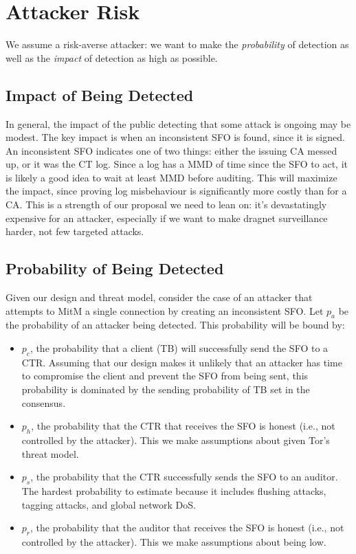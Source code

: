\section{Attacker Risk}
We assume a risk-averse attacker: we want to make the \emph{probability} of
detection as well as the \emph{impact} of detection as high as possible.

\subsection{Impact of Being Detected}


In general, the impact of the public detecting that some attack is ongoing may
be modest. The key impact is when an inconsistent SFO is found, since it is
signed. An inconsistent SFO indicates one of two things: either the issuing CA
messed up, or it was the CT log. Since a log has a MMD of time since the SFO to
act, it is likely a good idea to wait at least MMD before auditing. This will
maximize the impact, since proving log misbehaviour is significantly more costly
than for a CA. This is a strength of our proposal we need to lean on: it's
devastatingly expensive for an attacker, especially if we want to make dragnet
surveillance harder, not few targeted attacks.

\subsection{Probability of Being Detected}
Given our design and threat model, consider the case of an attacker that
attempts to MitM a single connection by creating an inconsistent SFO. Let $p_a$
be the probability of an attacker being detected. This probability will be bound
by:

\begin{itemize}
    \item $p_c$, the probability that a client (TB) will successfully send the
    SFO to a CTR. Assuming that our design makes it unlikely that an attacker
    has time to compromise the client and prevent the SFO from being sent, this
    probability is dominated by the sending probability of TB set in the
    consensus.
    \item $p_h$, the probability that the CTR that receives the SFO is honest
    (i.e., not controlled by the attacker). This we make assumptions about given
    Tor's threat model.
    \item $p_s$, the probability that the CTR successfully sends the SFO to an
    auditor. The hardest probability to estimate because it includes flushing
    attacks, tagging attacks, and global network DoS.
    \item $p_r$, the probability that the auditor that receives the SFO is
    honest (i.e., not controlled by the attacker). This we make assumptions
    about being low.
\end{itemize}

